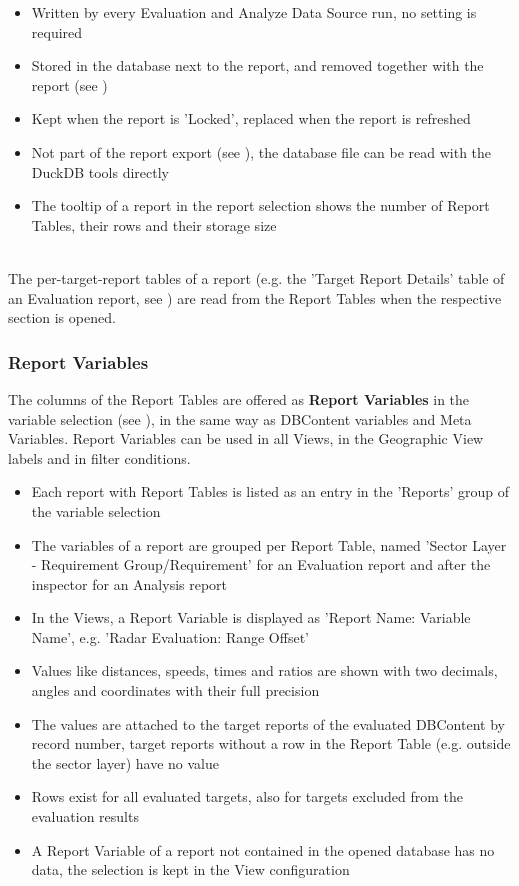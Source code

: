 \begin{itemize}
\item Written by every Evaluation and Analyze Data Source run, no setting is required
\item Stored in the database next to the report, and removed together with the report (see )
\item Kept when the report is 'Locked', replaced when the report is refreshed
\item Not part of the report export (see ), the database file can be read with the DuckDB tools directly
\item The tooltip of a report in the report selection shows the number of Report Tables, their rows and their storage size
\end{itemize}
\ \\

The per-target-report tables of a report (e.g. the 'Target Report Details' table of an Evaluation report, see ) 
are read from the Report Tables when the respective section is opened. \\

\subsubsection{Report Variables}
\label{sec:report_variables}

The columns of the Report Tables are offered as \textbf{Report Variables} in the variable selection (see ), 
in the same way as DBContent variables and Meta Variables. Report Variables can be used in all Views, in the Geographic View labels and in filter conditions. \\

\begin{itemize}
\item Each report with Report Tables is listed as an entry in the 'Reports' group of the variable selection
\item The variables of a report are grouped per Report Table, named 'Sector Layer - Requirement Group/Requirement' for an Evaluation report and after the inspector for an Analysis report
\item In the Views, a Report Variable is displayed as 'Report Name: Variable Name', e.g. 'Radar Evaluation: Range Offset'
\item Values like distances, speeds, times and ratios are shown with two decimals, angles and coordinates with their full precision
\item The values are attached to the target reports of the evaluated DBContent by record number, target reports without a row in the Report Table (e.g. outside the sector layer) have no value
\item Rows exist for all evaluated targets, also for targets excluded from the evaluation results
\item A Report Variable of a report not contained in the opened database has no data, the selection is kept in the View configuration
\end{itemize}
\ \\

